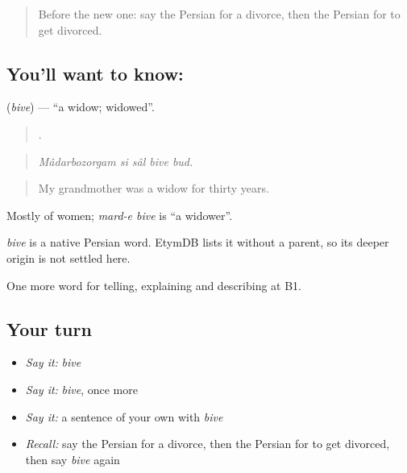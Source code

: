 \label{lesson:FA-C336-bive}



\begin{quote}
Before the new one: say the Persian for a divorce, then the Persian for to get divorced.
\end{quote}

\subsection*{You'll want to know: }
\textbf{} (\emph{bive}) — \textquotedblleft{}a widow; widowed\textquotedblright{}.

\begin{quote}
    .
\end{quote}

\begin{quote}
\emph{Mâdarbozorgam si sâl bive bud.}
\end{quote}

\begin{quote}
My grandmother was a widow for thirty years.
\end{quote}

Mostly of women; \emph{mard-e bive} is \textquotedblleft{}a widower\textquotedblright{}.

\begin{cousinweb}
\emph{bive} is a native Persian word. EtymDB lists it without a parent, so its deeper origin is not settled here.
\end{cousinweb}

\begin{grammarlens}[title={What you've built}]
One more word for telling, explaining and describing at B1.
\end{grammarlens}

\subsection*{Your turn}
\begin{itemize}
\raggedright
  \item \emph{Say it:} \emph{bive}
  \item \emph{Say it:} \emph{bive}, once more
  \item \emph{Say it:} a sentence of your own with \emph{bive}
  \item \emph{Recall:} say the Persian for a divorce, then the Persian for to get divorced, then say \emph{bive} again
\end{itemize}

